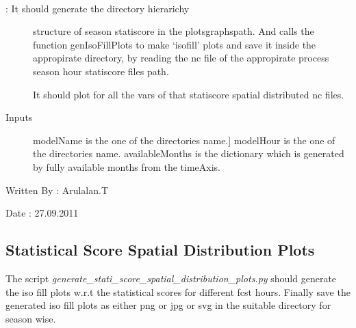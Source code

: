 \documentclass[letterpaper,10pt,english]{sphinxmanual}
\begin{document}
\begin{fulllineitems}
\label{diagnosis:generate_statistical_score_bars.genSeasonStatiScoreDirs}~\begin{description}
\item[{: It should generate the directory hierarichy}] \leavevmode
structure of season statiscore in the plotsgraphspath. And calls the
function genIsoFillPlots to make `isofill' plots and save it
inside the appropirate directory, by reading the nc file of the
appropirate process season hour statiscore files path.

It should plot for all the vars of that statiscore spatial distributed
nc files.

\item[{Inputs}] \leavevmode{[}modelName is the one of the directories name.{]}
modelHour is the one of the directories name.
availableMonths is the dictionary which is generated by fully
available months from the timeAxis.

\end{description}

Written By : Arulalan.T

Date : 27.09.2011

\end{fulllineitems}



\subsection{Statistical Score Spatial Distribution Plots}
\label{diagnosis:statistical-score-spatial-distribution-plots}
The script \emph{generate\_stati\_score\_spatial\_distribution\_plots.py} should generate the iso fill plots w.r.t the statistical scores for different fcst hours.
Finally save the generated iso fill plots as either png or jpg or svg in the suitable directory for season wise.
\label{diagnosis:module-generate_stati_score_spatial_distribution_plots}
\end{document}
